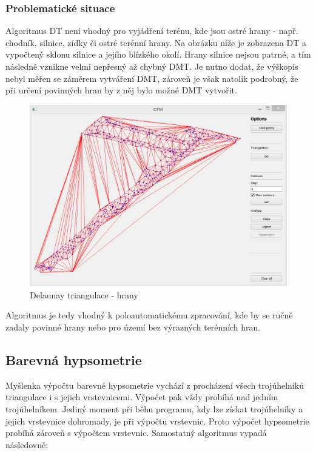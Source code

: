 \documentclass[a4paper, 12pt]{article}
\begin{document}
\subsubsection{Problematické situace}
Algoritmus DT není vhodný pro vyjádření terénu, kde jsou ostré hrany - např. chodník, silnice, zídky či ostré terénní hrany. Na obrázku níže je zobrazena DT a vypočtený sklonu silnice a jejího blízkého okolí. Hrany silnice nejsou patrné, a tím následně vznikne velmi nepřesný až chybný DMT. Je nutno dodat, že výškopis nebyl měřen se záměrem vytváření DMT, zároveň je však natolik podrobný, že při určení povinných hran by z něj bylo možné DMT vytvořit.

\begin{figure}[h]
	\centering
	\includegraphics[width=15cm]{hrany.jpg}
	\caption{Delaunay triangulace - hrany}
\end{figure}


Algoritmus je tedy vhodný k poloautomatickému zpracování, kde by se ručně zadaly povinné hrany nebo pro území bez výrazných terénních hran.

\subsection{Barevná hypsometrie}
Myšlenka výpočtu barevné hypsometrie vychází z procházení všech trojúhelníků triangulace i s jejich vrstevnicemi. Výpočet pak vždy probíhá nad jedním trojúhelníkem. Jediný moment při běhu programu, kdy lze získat trojúhelníky a jejich vrstevnice dohromady, je při výpočtu vrstevnic. Proto výpočet hypsometrie probíhá zároveň s výpočtem vrstevnic. Samostatný algoritmus vypadá následovně:
\end{document}
